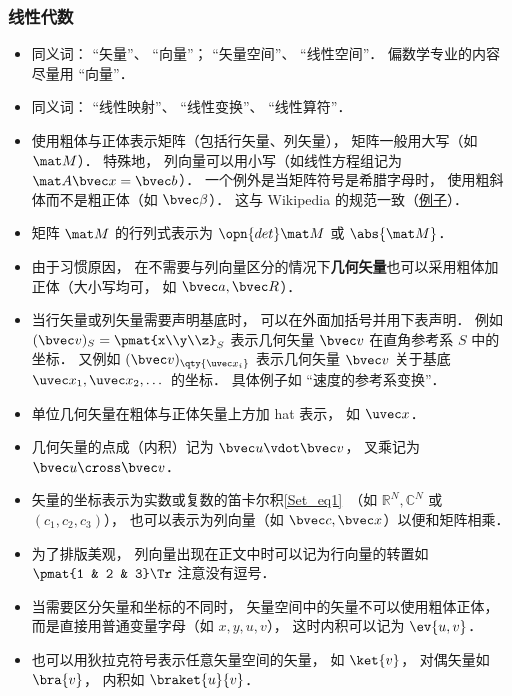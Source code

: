 \subsubsection{线性代数}
\begin{itemize}
\item 同义词： “矢量”、 “向量”； “矢量空间”、 “线性空间”． 偏数学专业的内容尽量用 “向量”．
\item 同义词： “线性映射”、 “线性变换”、 “线性算符”．
\item 使用粗体与正体表示矩阵（包括行矢量、列矢量）， 矩阵一般用大写（如 $\mat M$）． 特殊地， 列向量可以用小写（如线性方程组记为 $\mat A \bvec x = \bvec b$）． 一个例外是当矩阵符号是希腊字母时， 使用粗斜体而不是粗正体（如 $\bvec \beta$）． 这与 Wikipedia 的规范一致（\href{https://en.wikipedia.org/wiki/Angular_acceleration}{例子}）．
\item 矩阵 $\mat M$ 的行列式表示为 $\opn{det}\mat M$ 或 $\abs{\mat M}$．
\item 由于习惯原因， 在不需要与列向量区分的情况下\textbf{几何矢量}也可以采用粗体加正体（大小写均可， 如 $\bvec a, \bvec R$）．
\item 当行矢量或列矢量需要声明基底时， 可以在外面加括号并用下表声明． 例如 $(\bvec v)_S = \pmat{x\\y\\z}_S$ 表示几何矢量 $\bvec v$ 在直角参考系 $S$ 中的坐标． 又例如 $(\bvec v)_{\qty{\uvec x_i}}$ 表示几何矢量 $\bvec v$ 关于基底 $\uvec x_1, \uvec x_2, \dots$ 的坐标． 具体例子如 “速度的参考系变换”．
\item 单位几何矢量在粗体与正体矢量上方加 hat 表示， 如 $\uvec x$．
\item 几何矢量的点成（内积）记为 $\bvec u \vdot \bvec v$， 叉乘记为 $\bvec u \cross \bvec v$．
\item 矢量的坐标表示为实数或复数的笛卡尔积\autoref{Set_eq1}~（如 $\mathbb R^N, \mathbb C^N$ 或 $(c_1, c_2, c_3)$）， 也可以表示为列向量（如 $\bvec c, \bvec x$）以便和矩阵相乘．
\item 为了排版美观， 列向量出现在正文中时可以记为行向量的转置如 $\pmat{1 & 2 & 3}\Tr$ 注意没有逗号．
\item 当需要区分矢量和坐标的不同时， 矢量空间中的矢量不可以使用粗体正体， 而是直接用普通变量字母（如 $x, y, u, v$）， 这时内积可以记为 $\ev{u, v}$．
\item 也可以用狄拉克符号表示任意矢量空间的矢量， 如 $\ket{v}$， 对偶矢量如 $\bra{v}$， 内积如 $\braket{u}{v}$．
\end{itemize}

